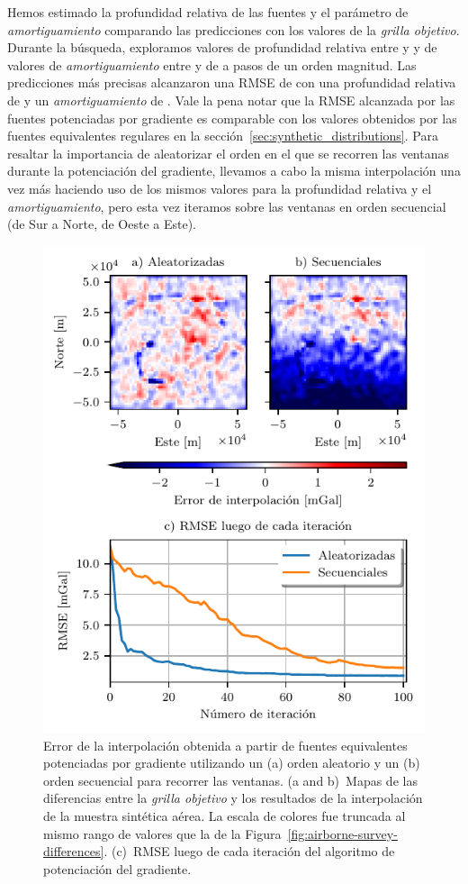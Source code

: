 Hemos estimado la profundidad relativa de las fuentes y el parámetro de
\emph{amortiguamiento} comparando las predicciones con los valores de la
\emph{grilla objetivo}.
Durante la búsqueda, exploramos valores de profundidad relativa entre
\EqlBoostAirborneMinDepth{} y
\EqlBoostAirborneMaxDepth{} y de valores de \emph{amortiguamiento} entre
\EqlBoostAirborneMinDamping{} y \EqlBoostAirborneMaxDamping{}
de a pasos de un orden magnitud.
Las predicciones más precisas alcanzaron una \ac{RMSE} de
\EqlBoostAirborneRmsScore{} con una profundidad relativa de
\EqlBoostAirborneDepth{} y
un \emph{amortiguamiento} de \EqlBoostAirborneDamping{}.
Vale la pena notar que la \ac{RMSE} alcanzada por las fuentes potenciadas por
gradiente es comparable con los valores obtenidos por las fuentes equivalentes
regulares en la sección~\ref{sec:synthetic_distributions}.
Para resaltar la importancia de aleatorizar el orden en el que se recorren las
ventanas durante la potenciación del gradiente, llevamos a cabo la misma
interpolación una vez más haciendo uso de los mismos valores para la profundidad
relativa y el \emph{amortiguamiento}, pero esta vez iteramos sobre las ventanas
en orden secuencial (de Sur a Norte, de Oeste a Este).

\begin{figure}[t!]
    \centering
    \includegraphics[width=0.7\linewidth]{figs/eql-gradient-boosted/eql-boost-airborne.pdf}
    \caption{
        Error de la interpolación obtenida a partir de fuentes equivalentes
        potenciadas por gradiente utilizando un (a) orden aleatorio y un (b)
        orden secuencial para recorrer las ventanas.
        (a and b)~Mapas de las diferencias entre la \emph{grilla objetivo}
        y los resultados de la interpolación de la muestra sintética aérea.
        La escala de colores fue truncada al mismo rango de valores que la de
        la Figura~\ref{fig:airborne-survey-differences}.
        (c)~\acl{RMSE} luego de cada iteración del algoritmo de potenciación del
        gradiente.
}
\label{fig:eql-boost-airborne}
\end{figure}

